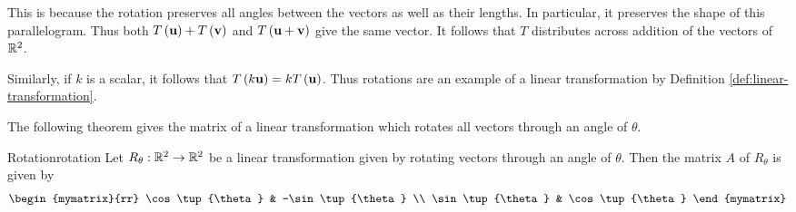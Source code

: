 This is because the rotation preserves all angles between the vectors
as well as their lengths. In particular, it preserves the shape of
this parallelogram. Thus both
$T\left(\mbox{\bf u}\right)+T\left(\mbox{\bf v}\right)$ and
$T\left(\mbox{\bf u}+\mbox{\bf v}\right)$ give the same vector. It follows
that $T$ distributes across addition of the vectors of
$\mathbb{R}^{2}$.

Similarly, if $k$ is a scalar, it follows that $T\left(k\mbox{\bf u}\right)=kT\left(\mbox{\bf u}\right)$.
Thus rotations are an example of a
linear transformation by Definition \ref{def:linear-transformation}.

The following theorem gives the matrix of a linear transformation which rotates all vectors through an angle of $\theta$. 

\begin{theorem}{Rotation}{rotation}
Let $R_{\theta}: \mathbb{R}^2 \to \mathbb{R}^2$ be a linear transformation given by rotating vectors through an angle of $\theta$. Then the matrix $A$ of $R_{\theta}$ is given by 
\[
\begin{mymatrix}{rr}
\cos \tup{\theta } & -\sin \tup{\theta } \\
\sin \tup{\theta } & \cos \tup{\theta }
\end{mymatrix}
\]
\end{theorem}

